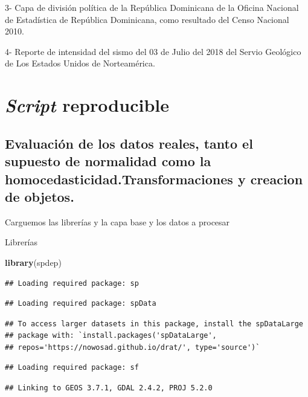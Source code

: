 \documentclass[11pt,]{article}
\newenvironment{Shaded}{\begin{snugshade}}{\end{snugshade}}
\newcommand{\KeywordTok}[1]{\textcolor[rgb]{0.13,0.29,0.53}{\textbf{#1}}}
\newcommand{\NormalTok}[1]{#1}
\begin{document}
3- Capa de división política de la República Dominicana de la Oficina
Nacional de Estadística de República Dominicana, como resultado del
Censo Nacional 2010.

4- Reporte de intensidad del sismo del 03 de Julio del 2018 del Servio
Geológico de Los Estados Unidos de Norteamérica.

\section{\texorpdfstring{\emph{Script}
reproducible}{Script reproducible}}\label{script-reproducible}

\subsection{Evaluación de los datos reales, tanto el supuesto de
normalidad como la homocedasticidad.Transformaciones y creacion de
objetos.}\label{evaluaciuxf3n-de-los-datos-reales-tanto-el-supuesto-de-normalidad-como-la-homocedasticidad.transformaciones-y-creacion-de-objetos.}

Carguemos las librerías y la capa base y los datos a procesar

Librerías

\begin{Shaded}
\begin{Highlighting}[]
\KeywordTok{library}\NormalTok{(spdep)}
\end{Highlighting}
\end{Shaded}

\begin{verbatim}
## Loading required package: sp
\end{verbatim}

\begin{verbatim}
## Loading required package: spData
\end{verbatim}

\begin{verbatim}
## To access larger datasets in this package, install the spDataLarge
## package with: `install.packages('spDataLarge',
## repos='https://nowosad.github.io/drat/', type='source')`
\end{verbatim}

\begin{verbatim}
## Loading required package: sf
\end{verbatim}

\begin{verbatim}
## Linking to GEOS 3.7.1, GDAL 2.4.2, PROJ 5.2.0
\end{verbatim}
\end{document}
